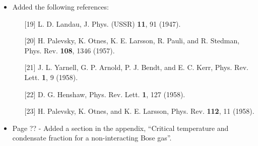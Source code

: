 \documentclass{article}
\begin{document}
\begin{itemize}
\item Added the following references:
\begin{itemize}
\item[][19] L. D. Landau, J. Phys. (USSR) {\bf 11}, 91 (1947).
\item[][20] H. Palevsky, K. Otnes, K. E. Larsson, R. Pauli, and R. Stedman, Phys. Rev. {\bf 108}, 1346
(1957).
\item[][21] J. L. Yarnell, G. P. Arnold, P. J. Bendt, and E. C. Kerr, Phys. Rev. Lett. {\bf 1}, 9 (1958).
\item[][22] D. G. Henshaw, Phys. Rev. Lett. {\bf 1}, 127 (1958).
\item[][23] H. Palevsky, K. Otnes, and K. E. Larsson, Phys. Rev. {\bf 112}, 11 (1958).
\end{itemize}


\item Page ?? - Added a section in the appendix, ``Critical temperature and condensate fraction for a non-interacting
Bose gas''.

\end{itemize}
\end{document}
